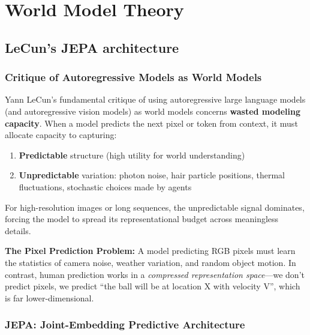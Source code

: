 
\section{World Model Theory}

\subsection{LeCun's JEPA architecture}

\subsubsection{Critique of Autoregressive Models as World Models}

Yann LeCun's fundamental critique of using autoregressive large language models (and autoregressive vision models) as world models concerns \textbf{wasted modeling capacity}. When a model predicts the next pixel or token from context, it must allocate capacity to capturing:

\begin{enumerate}
    \item \textbf{Predictable} structure (high utility for world understanding)
    \item \textbf{Unpredictable} variation: photon noise, hair particle positions, thermal fluctuations, stochastic choices made by agents
\end{enumerate}

For high-resolution images or long sequences, the unpredictable signal dominates, forcing the model to spread its representational budget across meaningless details.

\begin{warnbox}
    \textbf{The Pixel Prediction Problem:} A model predicting RGB pixels must learn the statistics of camera noise, weather variation, and random object motion. In contrast, human prediction works in a \textit{compressed representation space}---we don't predict pixels, we predict ``the ball will be at location X with velocity V'', which is far lower-dimensional.
\end{warnbox}

\subsubsection{JEPA: Joint-Embedding Predictive Architecture}

